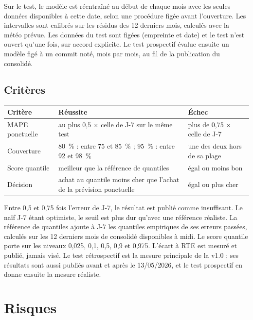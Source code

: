\documentclass[11pt,a4paper]{article}
\begin{document}
Sur le test, le modèle est réentraîné au début de chaque mois avec les seules données disponibles à cette date, selon une procédure figée avant l'ouverture. Les intervalles sont calibrés sur les résidus des 12 derniers mois, calculés avec la météo prévue. Les données du test sont figées (empreinte et date) et le test n'est ouvert qu'une fois, sur accord explicite. Le test prospectif évalue ensuite un modèle figé à un commit noté, mois par mois, au fil de la publication du consolidé.

\subsection{Critères}

\begin{table}[H]
\small
\begin{tabularx}{\linewidth}{lYY}
\toprule
\textbf{Critère} & \textbf{Réussite} & \textbf{Échec} \\
\midrule
MAPE ponctuelle & au plus 0,5 × celle de J-7 sur le même test & plus de 0,75 × celle de J-7 \\
Couverture & 80~\% : entre 75 et 85~\% ; 95~\% : entre 92 et 98~\% & une des deux hors de sa plage \\
Score quantile & meilleur que la référence de quantiles & égal ou moins bon \\
Décision & achat au quantile moins cher que l'achat de la prévision ponctuelle & égal ou plus cher \\
\bottomrule
\end{tabularx}
\end{table}

Entre 0,5 et 0,75 fois l'erreur de J-7, le résultat est publié comme insuffisant. Le naïf J-7 étant optimiste, le seuil est plus dur qu'avec une référence réaliste. La référence de quantiles ajoute à J-7 les quantiles empiriques de ses erreurs passées, calculés sur les 12 derniers mois de consolidé disponibles à midi. Le score quantile porte sur les niveaux 0,025, 0,1, 0,5, 0,9 et 0,975. L'écart à RTE est mesuré et publié, jamais visé. Le test rétrospectif est la mesure principale de la v1.0 ; ses résultats sont aussi publiés avant et après le 13/05/2026, et le test prospectif en donne ensuite la mesure réaliste.

\section{Risques}
\end{document}
